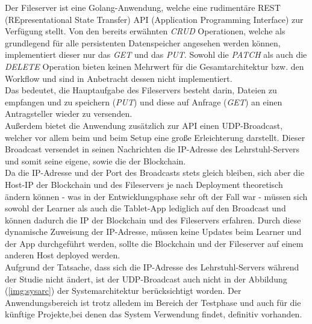 Der Fileserver ist eine Golang-Anwendung, welche eine rudimentäre REST (REpresentational State Transfer) API (Application Programming Interface) zur Verfügung stellt.
Von den bereits erwähnten \textit{CRUD} Operationen, welche als grundlegend für alle persistenten Datenspeicher angesehen werden können, implementiert dieser nur das \textit{GET} und das \textit{PUT}. Sowohl die \textit{PATCH} als auch die \textit{DELETE} Operation bieten keinen Mehrwert für die Gesamtarchitektur bzw. den Workflow und sind in Anbetracht dessen nicht implementiert.\\
Das bedeutet, die Hauptaufgabe des Fileservers besteht darin, Dateien zu empfangen und zu speichern (\textit{PUT}) und diese auf Anfrage (\textit{GET}) an einen Antragsteller wieder zu versenden.\\
Außerdem bietet die Anwendung zusätzlich zur API einen UDP-Broadcast, welcher vor allem beim  und beim Setup eine große Erleichterung darstellt. Dieser Broadcast versendet in seinen Nachrichten die IP-Adresse des Lehrstuhl-Servers und somit seine eigene, sowie die der Blockchain.\\
Da die IP-Adresse und der Port des Broadcasts stets gleich bleiben, sich aber die Host-IP der Blockchain und des Fileservers je nach Deployment theoretisch ändern können - was in der Entwicklungsphase sehr oft der Fall war - müssen sich sowohl der Learner als auch die Tablet-App lediglich auf den Broadcast  und können dadurch die IP der Blockchain und des Fileservers erfahren. Durch diese dynamische Zuweisung der IP-Adresse, müssen keine Updates beim Learner und der App durchgeführt werden, sollte die Blockchain und der Fileserver auf einem anderen Host deployed werden. \\
Aufgrund der Tatsache, dass sich die IP-Adresse des Lehrstuhl-Servers während der Studie nicht ändert, ist der UDP-Broadcast auch nicht in der Abbildung (\ref{img:sysarc}) der Systemarchitektur berücksichtigt worden. Der Anwendungsbereich ist trotz alledem im Bereich der Testphase und auch für die künftige Projekte,bei denen das System Verwendung findet, definitiv vorhanden.

